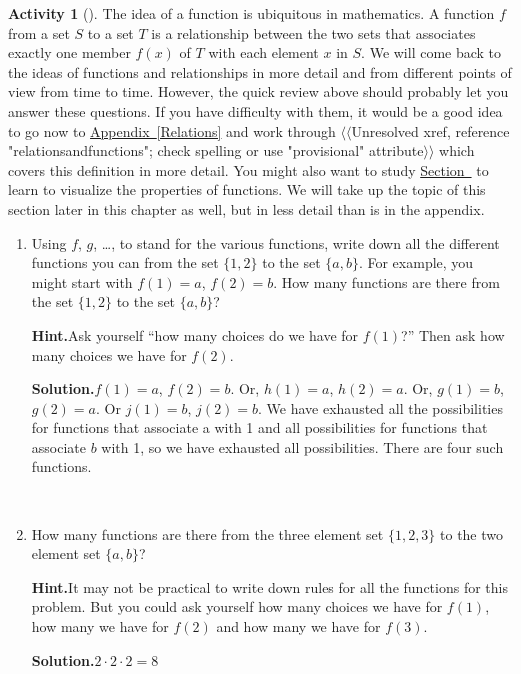 \documentclass[10pt,]{book}
\theoremstyle{plain}
\theoremstyle{definition}
\newtheorem{activity}[project]{Activity}
\numberwithin{equation}{chapter}
\begin{document}
\begin{activity}[]\label{countingfunctions}
The idea of a function is ubiquitous in mathematics. A function \(f\) from a set \(S\) to a set \(T\) is a relationship between the two sets that associates exactly one member \(f(x)\) of \(T\) with each element \(x\) in \(S\). We will come back to the ideas of functions and relationships in more detail and from different points of view from time to time. However, the quick review above should probably let you answer these questions. If you have difficulty with them, it would be a good idea to go now to \hyperref[Relations]{Appendix~\ref{Relations}} and work through {$\langle\langle$Unresolved xref, reference "relationsandfunctions"; check spelling or use "provisional" attribute$\rangle\rangle$} which covers this definition in more detail. You might also want to study \hyperref[digraphsoffunctions]{Section~} to learn to visualize the properties of functions. We will take up the topic of this section later in this chapter as well, but in less detail than is in the appendix.%
~\par
\begin{enumerate}[label=(\alph*)]
 \item Using \(f\), \(g\), \dots{}, to stand for the various functions, write down all the different functions you can from the set \(\{1,2\}\) to the set \(\{a,b\}\).  For example, you might start with \(f(1)=a\), \(f(2)=b\).  How many functions are there from the set \(\{1,2\}\) to the set \(\{a,b\}\)?%
\par\medskip\noindent%
\textbf{Hint.}\quad Ask yourself “how many choices do we have for \(f(1)\)?” Then ask how many choices we have for \(f(2)\).%
\par\medskip\noindent%
\textbf{Solution.}\quad \(f(1) =a\), \(f(2) = b\). Or, \(h(1) =a\), \(h(2) =a\). Or, \(g(1)=b\), \(g(2) = a\). Or \(j(1) =b\), \(j(2) =b\). We have exhausted all the possibilities for functions that associate a with 1 and all possibilities for functions that associate \(b\) with 1, so we have exhausted all possibilities. There are four such functions.%

~\par
\item How many functions are there from the three element set \(\{1,2,3\}\) to the two element set \(\{a,b\}\)?%
\par\medskip\noindent%
\textbf{Hint.}\quad It may not be practical to write down rules for all the functions for this problem. But you could ask yourself how many choices we have for \(f(1)\), how many we have for \(f(2)\) and how many we have for \(f(3)\).%
\par\medskip\noindent%
\textbf{Solution.}\quad \(2\cdot2\cdot2 = 8\)%


\end{enumerate}
\end{activity}
\end{document}
